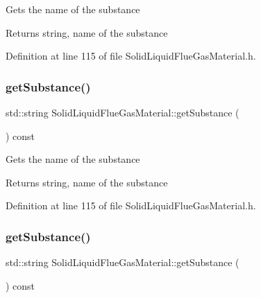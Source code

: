 Gets the name of the substance \begin{DoxyReturn}{Returns}
string, name of the substance 
\end{DoxyReturn}


Definition at line 115 of file Solid\+Liquid\+Flue\+Gas\+Material.\+h.

\mbox{\label{class_solid_liquid_flue_gas_material_a6e07a23fb05c15c7e5dba39334988de8}} 
\subsubsection{\texorpdfstring{get\+Substance()}{getSubstance()}\hspace{0.1cm}{\footnotesize\ttfamily [2/3]}}
{\footnotesize\ttfamily std\+::string Solid\+Liquid\+Flue\+Gas\+Material\+::get\+Substance (\begin{DoxyParamCaption}{ }\end{DoxyParamCaption}) const\hspace{0.3cm}{\ttfamily [inline]}}

Gets the name of the substance \begin{DoxyReturn}{Returns}
string, name of the substance 
\end{DoxyReturn}


Definition at line 115 of file Solid\+Liquid\+Flue\+Gas\+Material.\+h.

\mbox{\label{class_solid_liquid_flue_gas_material_a6e07a23fb05c15c7e5dba39334988de8}} 
\subsubsection{\texorpdfstring{get\+Substance()}{getSubstance()}\hspace{0.1cm}{\footnotesize\ttfamily [3/3]}}
{\footnotesize\ttfamily std\+::string Solid\+Liquid\+Flue\+Gas\+Material\+::get\+Substance (\begin{DoxyParamCaption}{ }\end{DoxyParamCaption}) const\hspace{0.3cm}{\ttfamily [inline]}}

